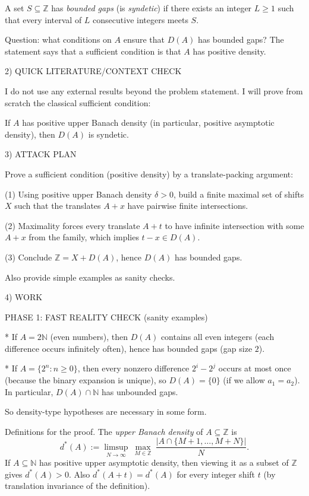 A set $S\subseteq\mathbb Z$ has \emph{bounded gaps} (is \emph{syndetic}) if there exists an integer $L\ge 1$ such that every interval of $L$ consecutive integers meets $S$.

Question: what conditions on $A$ ensure that $D(A)$ has bounded gaps?
The statement says that a sufficient condition is that $A$ has positive density.


2) QUICK LITERATURE/CONTEXT CHECK

I do not use any external results beyond the problem statement.
I will prove from scratch the classical sufficient condition:

If $A$ has positive upper Banach density (in particular, positive asymptotic density), then $D(A)$ is syndetic.


3) ATTACK PLAN

Prove a sufficient condition (positive density) by a translate-packing argument:

(1) Using positive upper Banach density $\delta>0$, build a finite maximal set of shifts $X$ such that the translates $A+x$ have pairwise finite intersections.

(2) Maximality forces every translate $A+t$ to have infinite intersection with some $A+x$ from the family, which implies $t-x\in D(A)$.

(3) Conclude $\mathbb Z = X + D(A)$, hence $D(A)$ has bounded gaps.

Also provide simple examples as sanity checks.


4) WORK

PHASE 1: FAST REALITY CHECK (sanity examples)

* If $A=2\mathbb N$ (even numbers), then $D(A)$ contains all even integers (each difference occurs infinitely often), hence has bounded gaps (gap size $2$).

* If $A=\{2^n: n\ge 0\}$, then every nonzero difference $2^i-2^j$ occurs at most once (because the binary expansion is unique), so $D(A)=\{0\}$ (if we allow $a_1=a_2$). In particular, $D(A)\cap\mathbb N$ has unbounded gaps.

So density-type hypotheses are necessary in some form.


Definitions for the proof.
The \emph{upper Banach density} of $A\subseteq\mathbb Z$ is
\[
d^*(A):=\limsup_{N\to\infty}\ \max_{M\in\mathbb Z}\ \frac{|A\cap\{M+1,\dots,M+N\}|}{N}.
\]
If $A\subseteq\mathbb N$ has positive upper asymptotic density, then viewing it as a subset of $\mathbb Z$ gives $d^*(A)>0$.
Also $d^*(A+t)=d^*(A)$ for every integer shift $t$ (by translation invariance of the definition).



